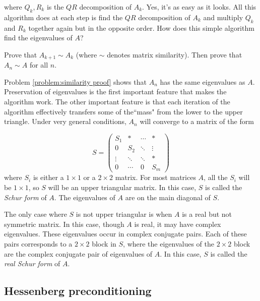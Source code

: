 where $Q_k, R_k$ is the $QR$ decomposition of $A_k$. Yes, it's as easy as it looks. All this algorithm does at each step is find the $QR$ decomposition of $A_k$ and multiply $Q_k$ and $R_k$ together again but in the opposite order. How does this simple algorithm find the eigenvalues of $A$? 

\begin{problem}
\label{problem:similarity proof}
Prove that $A_{k+1} \sim A_k$ (where $\sim$ denotes matrix similarity). Then prove that $A_n \sim A$ for all $n$.  
\end{problem}

Problem \ref{problem:similarity proof} shows that $A_n$ has the same eigenvalues as $A$. Preservation of eigenvalues is the first important feature that makes the algorithm work. The other important feature is that each iteration of the algorithm effectively transfers some of the``mass" from the lower to the upper triangle. Under very general conditions, $A_n$ will converge to a matrix of the form

\begin{equation}
\label{eq:Schur form}
S = 
     \begin{pmatrix}
          S_1 &* & \cdots & * \\
           0     &S_2  &  \ddots & \vdots \\
           \vdots  & \ddots & \ddots & *  \\
           0 & \cdots & 0 & S_m
    \end{pmatrix}
\end{equation}
where $S_i$ is either a $1 \times 1$ or a $2 \times 2$ matrix. For most matrices $A$, all the $S_i$ will be $1 \times 1$, so $S$ will be an upper triangular matrix. In this case, $S$ is called the \emph{Schur form} of $A$. The eigenvalues of $A$ are on the main diagonal of $S$.

The only case where $S$ is not upper triangular is when $A$ is a real but not symmetric matrix. In this case, though $A$ is real, it may have complex eigenvalues. These eigenvalues occur in complex conjugate pairs. Each of these pairs corresponds to a $2 \times 2$ block in $S$, where the eigenvalues of the $2 \times 2$ block are the complex conjugate pair of eigenvalues of $A$. In this case, $S$ is called the \emph{real Schur form} of $A$.

\subsection*{Hessenberg preconditioning}

